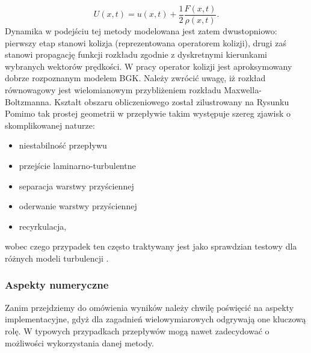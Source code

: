 \documentclass[12pt]{article}
\begin{document}
\begin{equation}
U(x,t) = u(x,t) + \frac{1}{2}\frac{F(x,t)}{\rho(x,t)}.
\end{equation}
Dynamika w podejściu tej metody modelowana jest zatem dwustopniowo: pierwszy etap stanowi kolizja (reprezentowana operatorem kolizji), drugi zaś stanowi propagację funkcji rozkładu zgodnie z dyskretnymi kierunkami wybranych wektorów prędkości. W pracy operator kolizji jest aproksymowany dobrze rozpoznanym modelem BGK. Należy zwrócić uwagę, iż rozkład równowagowy jest wielomianowym przybliżeniem rozkładu Maxwella-Boltzmanna.\newline
Kształt obszaru obliczeniowego został zilustrowany na Rysunku
Pomimo tak prostej geometrii w przepływie takim występuje szereg zjawisk o skomplikowanej naturze:
\begin{itemize}
	\item niestabilność przepływu
	\item przejście laminarno-turbulentne
	\item separacja warstwy przyściennej
	\item oderwanie warstwy przyściennej
	\item recyrkulacja,
\end{itemize}
wobec czego przypadek ten często traktywany jest jako sprawdzian testowy dla różnych modeli turbulencji \cite{Salazar}.
\subsubsection{Aspekty numeryczne}
Zanim przejdziemy do omówienia wyników należy chwilę poświęcić na aspekty implementacyjne, gdyż dla zagadnień wielowymiarowych odgrywają one kluczową rolę. W typowych przypadkach przepływów mogą nawet zadecydować o możliwości wykorzystania danej metody.
\end{document}
